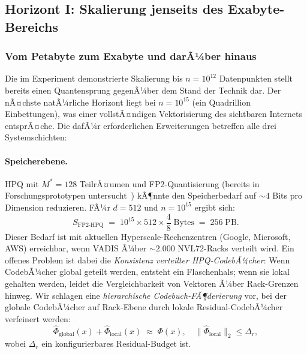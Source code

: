 ﻿\documentclass[12pt,a4paper]{article}
\begin{document}
\subsection{Horizont I: Skalierung jenseits des Exabyte-Bereichs}
\label{sub:horizont1}

\subsubsection{Vom Petabyte zum Exabyte und darÃ¼ber hinaus}

Die im Experiment demonstrierte Skalierung bis $n = 10^{12}$
Datenpunkten stellt bereits einen Quantensprung gegenÃ¼ber dem
Stand der Technik dar. Der nÃ¤chste natÃ¼rliche Horizont liegt
bei $n = 10^{15}$ (ein Quadrillion Einbettungen), was einer
vollstÃ¤ndigen Vektorisierung des sichtbaren Internets entsprÃ¤che.
Die dafÃ¼r erforderlichen Erweiterungen betreffen alle drei
Systemschichten:

\paragraph{Speicherebene.}
HPQ mit $M^* = 128$ TeilrÃ¤umen und FP2-Quantisierung
(bereits in Forschungsprototypen untersucht~\cite{frantar2022gptq})
kÃ¶nnte den Speicherbedarf auf $\sim 4$ Bits pro Dimension
reduzieren. FÃ¼r $d = 512$ und $n = 10^{15}$ ergibt sich:
\[
  S_{\text{FP2-HPQ}} \;=\; 10^{15} \times 512 \times \frac{4}{8} \;\text{Bytes}
  \;=\; 256\;\text{PB}.
\]
Dieser Bedarf ist mit aktuellen Hyperscale-Rechenzentren
(Google, Microsoft, AWS) erreichbar, wenn VADIS Ã¼ber
$\sim 2.000$ NVL72-Racks verteilt wird. Ein offenes Problem
ist dabei die \emph{Konsistenz verteilter HPQ-CodebÃ¼cher}:
Wenn CodebÃ¼cher global geteilt werden, entsteht ein
Flaschenhals; wenn sie lokal gehalten werden, leidet die
Vergleichbarkeit von Vektoren Ã¼ber Rack-Grenzen hinweg.
Wir schlagen eine \emph{hierarchische Codebuch-FÃ¶derierung}
vor, bei der globale CodebÃ¼cher auf Rack-Ebene durch
lokale Residual-CodebÃ¼cher verfeinert werden:
\begin{equation}
  \hat{\Phi}_{\text{global}}(x) + \hat{\Phi}_{\text{local}}(x)
  \;\approx\; \Phi(x),
  \quad \|\hat{\Phi}_{\text{local}}\|_2 \leq \Delta_r,
  \label{eq:hierarchical_cb}
\end{equation}
wobei $\Delta_r$ ein konfigurierbares Residual-Budget ist.
\end{document}
